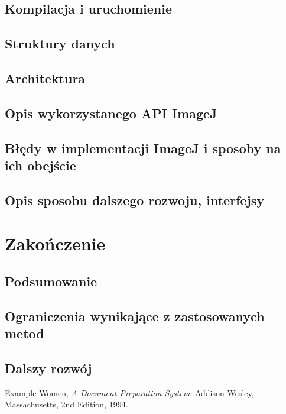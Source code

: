 \documentclass[declaration,shortabstract]{iithesis}
\begin{document}
\section{Kompilacja i uruchomienie}

\section{Struktury danych}
\section{Architektura}
\section{Opis wykorzystanego API ImageJ}
\section{Błędy w implementacji ImageJ i sposoby na ich obejście}
\section{Opis sposobu dalszego rozwoju, interfejsy}






\chapter{Zakończenie}



\section{Podsumowanie}
\section{Ograniczenia wynikające z zastosowanych metod}
\section{Dalszy rozwój}






\begin{thebibliography}{1}
  Example Women,
  \emph{A Document Preparation System}.
  Addison Wesley, Massachusetts,
  2nd Edition,
  1994.
\end{thebibliography}
\end{document}
